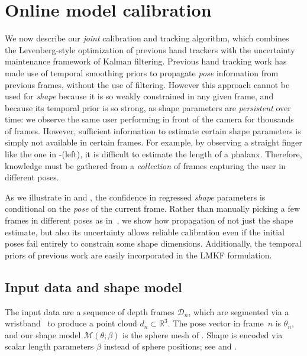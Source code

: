 

\section{Online model calibration}
\label{sec:technical}

We now describe our \emph{joint} calibration and tracking algorithm, which combines the Levenberg-style optimization of previous hand trackers with the uncertainty maintenance framework of Kalman filtering.   Previous hand tracking work has made use of temporal smoothing priors to propagate {\em pose} information from previous frames, without the use of filtering.  However this approach cannot be used for {\em shape} because it is so weakly constrained in any given frame, and because its temporal prior is so strong, as shape parameters are \emph{persistent} over time: we observe the same user performing in front of the camera for thousands of frames. However, sufficient information to estimate certain shape parameters is simply not available in certain frames. For example, by observing a straight finger like the one in -(left), it is difficult to estimate the length of a phalanx. Therefore, knowledge must be 
gathered from a \emph{collection} of frames capturing the user in different poses. 



As we illustrate in  and , the confidence in regressed \emph{shape} parameters is conditional on the \emph{pose} of the current frame.
Rather than manually picking a few frames in different poses as in~\cite{taylor2016joint}, we show how propagation of not just the shape estimate, but also its uncertainty allows reliable calibration even if the initial poses fail entirely to constrain some shape dimensions.  Additionally, the temporal priors of previous work are easily incorporated in the LMKF formulation.



\subsection*{Input data and shape model}
The input data are a sequence of depth frames $\mathcal{D}_n$, which are segmented via a wristband~\cite{tagliasacchi2015robust} to produce a point cloud $d_n \subset \mathbb R^3$.   The pose vector in frame~$n$ is $\theta_n$, and our shape model $\mathcal{M}(\theta; \beta)$ is the sphere mesh of \cite{tkach2016sphere}.   Shape is encoded via scalar length parameters $\beta$ instead of sphere positions; see  and \cite{edoardo}.


